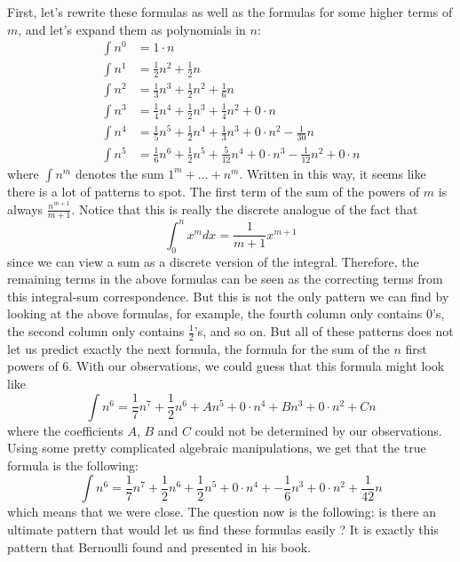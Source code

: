 First, let's rewrite these formulas as well as the formulas for some higher terms of $m$, and let's expand them as polynomials in $n$:
\begin{align*}
    \int n^0 &= 1\cdot n \\
    \int n^1 &= \frac{1}{2}n^2 + \frac{1}{2}n \\
    \int n^2 &= \frac{1}{3}n^3 + \frac{1}{2}n^2 + \frac{1}{6}n \\
    \int n^3 &= \frac{1}{4}n^4 + \frac{1}{2}n^3 + \frac{1}{4}n^2 + 0\cdot n \\
    \int n^4 &= \frac{1}{5}n^5 + \frac{1}{2}n^4 + \frac{1}{3}n^3 + 0\cdot n^2 - \frac{1}{30}n \\
    \int n^5 &= \frac{1}{6}n^6 + \frac{1}{2}n^5 + \frac{5}{12}n^4 + 0\cdot n^3 - \frac{1}{12}n^2 + 0\cdot n
\end{align*}
where $\int n^m$ denotes the sum $1^m + \dots + n^m$. Written in this way, it seems like there is a lot of patterns to spot. The first term of the sum of the powers of $m$ is always $\frac{n^{m+1}}{m+1}$. Notice that this is really the discrete analogue of the fact that
$$\int_{0}^{n}x^m dx = \frac{1}{m+1}x^{m+1}$$
since we can view a sum as a discrete version of the integral. Therefore, the remaining terms in the above formulas can be seen as the correcting terms from this integral-sum correspondence. But this is not the only pattern we can find by looking at the above formulas, for example, the fourth column only contains 0's, the second column only contains $\frac{1}{2}$'s, and so on. But all of these patterns does not let us predict exactly the next formula, the formula for the sum of the $n$ first powers of 6. With our observations, we could guess that this formula might look like
$$\int n^6 = \frac{1}{7}n^7 + \frac{1}{2}n^6 + An^5 + 0\cdot n^4 + Bn^3 + 0\cdot n^2 + Cn$$
where the coefficients $A$, $B$ and $C$ could not be determined by our observations. Using some pretty complicated algebraic manipulations, we get that the true formula is the following:
$$\int n^6 = \frac{1}{7}n^7 + \frac{1}{2}n^6 + \frac{1}{2}n^5 + 0\cdot n^4 + -\frac{1}{6}n^3 + 0\cdot n^2 + \frac{1}{42}n$$
which means that we were close. The question now is the following: is there an ultimate pattern that would let us find these formulas easily ? It is exactly this pattern that Bernoulli found and presented in his book.

